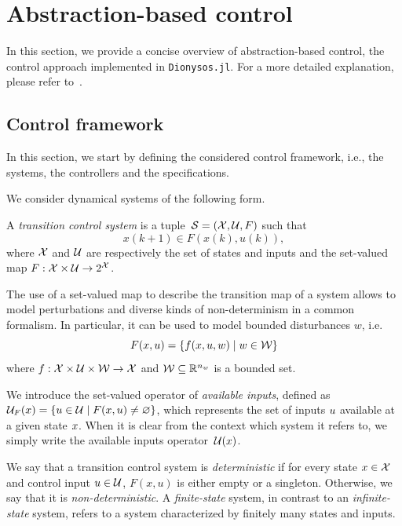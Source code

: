 \documentclass{juliacon}
\begin{document}
\section{Abstraction-based control} \label{sec:abstraction}

In this section, we provide a concise overview of abstraction-based control, the control approach implemented in \texttt{Dionysos.jl}. For a more detailed explanation, please refer to~\cite{tabuada2009verification,reissig2016feedback}.

\subsection{Control framework}

In this section, we start by defining the considered control framework, i.e., the systems, the controllers and the specifications.

\vskip 6pt

We consider dynamical systems of the following form.
\begin{defi}\label{def:sys}
A \emph{transition control system} is a tuple~$\mathcal{S} = (\mathcal{X}, \mathcal{U}, F)$ such that
$$x(k+1)\in F(x(k), u(k)),$$
where $\mathcal{X}$ and $\mathcal{U}$ are respectively the set of states and inputs and the set-valued map $F:\mathcal{X}\times \mathcal{U}\rightarrow 2^{\mathcal{X}}$.
\end{defi}

The use of a set-valued map to describe the transition map of a system allows to model perturbations and diverse kinds of non-determinism in a common formalism.
% 
In particular, it can be used to model bounded disturbances $w$, i.e.
\begin{equation}\label{eq:bounded_disturbances}
    F(x,u) = \{f(x,u,w) \mid w\in \mathcal{W}\}
\end{equation}
where $f:\mathcal{X}\times \mathcal{U}\times \mathcal{W}\rightarrow \mathcal{X}$ and $\mathcal{W}\subseteq \mathbb{R}^{n_w}$ is a bounded set.

\vskip 6pt

%
We introduce the set-valued operator of  \emph{available inputs}, defined as $\mathcal{U}_F(x) = \{ u \in \mathcal{U} \mid F(x,u) \neq \varnothing \}$, which represents the set of inputs $u$ available at a given state $x$. When it is clear from the context which system it refers to, we simply write the available inputs operator~$\mathcal{U}(x)$.

\vskip 6pt
%
We say that a transition control system is \emph{deterministic} if for every state $x \in \mathcal{X}$ and control input $u \in \mathcal{U}$, $F(x,u)$ is either empty or a singleton. Otherwise, we say that it is \emph{non-deterministic}. %
A \emph{finite-state} system, in contrast to an \emph{infinite-state} system, refers to a system characterized by finitely many states and inputs.
\end{document}
